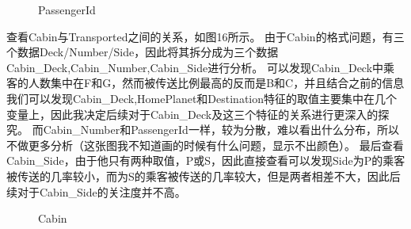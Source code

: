 \documentclass[../main.tex]{subfiles}
\begin{document}
        \begin{figure}[H]
            \centering
            \caption{PassengerId}
        \end{figure}

        查看Cabin与Transported之间的关系，如图16所示。
        由于Cabin的格式问题，有三个数据Deck/Number/Side，因此将其拆分成为三个数据Cabin\_Deck,Cabin\_Number,Cabin\_Side进行分析。
        可以发现Cabin\_Deck中乘客的人数集中在F和G，然而被传送比例最高的反而是B和C，并且结合之前的信息我们可以发现Cabin\_Deck,HomePlanet和Destination特征的取值主要集中在几个变量上，因此我决定后续对于Cabin\_Deck及这三个特征的关系进行更深入的探究。
        而Cabin\_Number和PassengerId一样，较为分散，难以看出什么分布，所以不做更多分析（这张图我不知道画的时候有什么问题，显示不出颜色）。
        最后查看Cabin\_Side，由于他只有两种取值，P或S，因此直接查看可以发现Side为P的乘客被传送的几率较小，而为S的乘客被传送的几率较大，但是两者相差不大，因此后续对于Cabin\_Side的关注度并不高。

        \begin{figure}[H]
            \centering
            
            \caption{Cabin}
        \end{figure}
\end{document}
